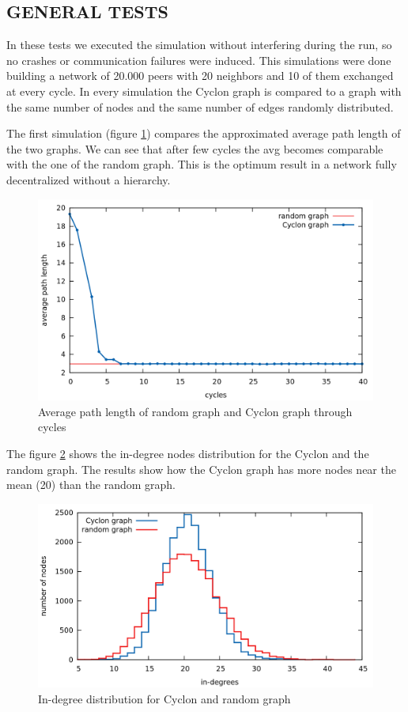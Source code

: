 \documentclass[a4paper,12pt,notitlepage]{article} %
\begin{document}
\subsection{GENERAL TESTS}

In these tests we executed the simulation without interfering during the run, so no crashes or 
 communication failures were induced. This simulations were done building a network of 20.000 
 peers with 20 neighbors and 10 of them exchanged at every cycle. In every simulation the Cyclon
 graph is compared to a graph with the same number of nodes and the same number of edges randomly distributed.

The first simulation  (figure \ref{avg}) compares the approximated average path length of the two graphs. We can 
 see that after few cycles the avg becomes comparable with the one of the random graph. This is the 
 optimum result in a network fully decentralized without a hierarchy.

\begin{figure} [H]
	\centering
	\includegraphics[width=1\textwidth]{img/avgplen}
	\caption{Average path length of random graph and Cyclon graph through  cycles }
	\label{avg}
\end{figure}


The figure \ref{deg} shows the in-degree nodes distribution for the Cyclon and the random graph.
 The results show how the Cyclon graph has more nodes near the mean (20) than the random graph.

\begin{figure} [H]
	\centering
	\includegraphics[width=1\textwidth]{img/Degrees}
	\caption{In-degree distribution for Cyclon and random graph}
	\label{deg}
\end{figure}
\end{document}
